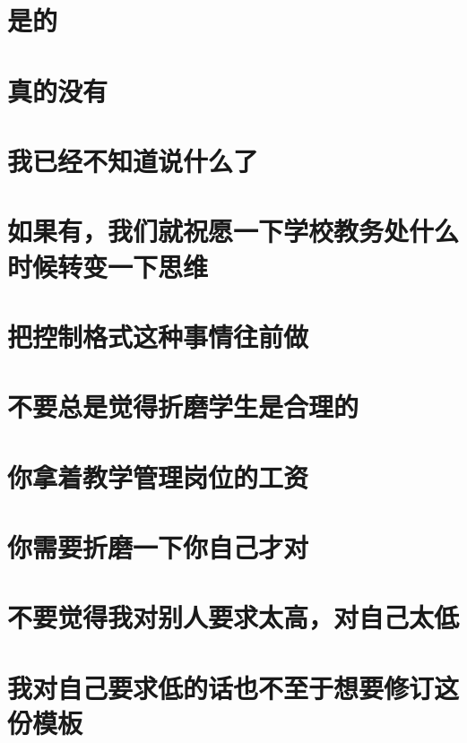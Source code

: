 \documentclass[a4paper,AutoFakeBold,oneside,12pt]{book}
\begin{document}
\section{是的}
\section{真的没有}
\section{我已经不知道说什么了}
\section{如果有，我们就祝愿一下学校教务处什么时候转变一下思维}
\section{把控制格式这种事情往前做}
\section{不要总是觉得折磨学生是合理的}
\section{你拿着教学管理岗位的工资}
\section{你需要折磨一下你自己才对}
\section{不要觉得我对别人要求太高，对自己太低}
\section{我对自己要求低的话也不至于想要修订这份模板}
\end{document}
